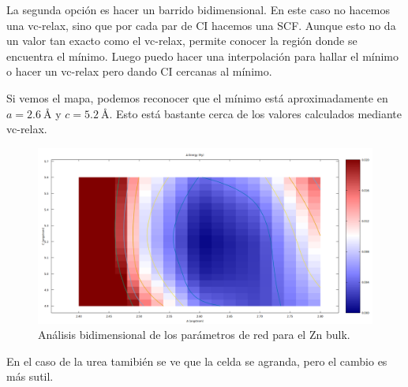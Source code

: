   La segunda opción es hacer un barrido bidimensional. En este caso no hacemos una vc-relax, sino que por cada par de CI hacemos una SCF. Aunque esto no da un valor tan exacto como el vc-relax, permite conocer la región donde se encuentra el mínimo. Luego puedo hacer una interpolación para hallar el mínimo o hacer un vc-relax pero dando CI cercanas al mínimo.

  Si vemos el mapa, podemos reconocer que el mínimo está aproximadamente en $a = 2.6\ \si{\angstrom}$ y $c = 5.2\ \si{\angstrom}$. Esto está bastante cerca de los valores calculados mediante vc-relax.

  \begin{figure}[H]
      \centering
       \includegraphics[scale = 0.30]{figs/D3/Zn_scan.png}
       \caption{Análisis bidimensional de los parámetros de red para el Zn bulk.}
   \end{figure}


  En el caso de la urea tamibién se ve que la celda se agranda, pero el cambio es más sutil.

